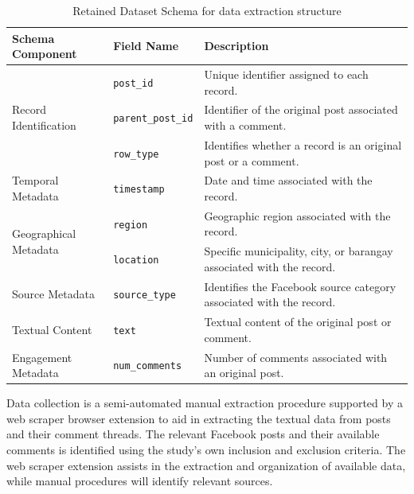 \begin{table}[htbp]
	\centering
	\caption{Retained Dataset Schema for data extraction structure}
	\label{tab:dataset_schema}
	\renewcommand{\arraystretch}{1.3}
	\begin{tabularx}{\textwidth}{l l X}
		\hline
		\textbf{Schema Component} & \textbf{Field Name} & \textbf{Description} \\
		\hline
		\multirow{3}{*}{Record Identification}
		& \texttt{post\_id} & Unique identifier assigned to each record. \\
		& \texttt{parent\_post\_id} & Identifier of the original post associated with a comment. \\
		& \texttt{row\_type} & Identifies whether a record is an original post or a comment. \\
		\hline
		Temporal Metadata
		& \texttt{timestamp} & Date and time associated with the record. \\
		\hline
		\multirow{2}{*}{Geographical Metadata}
		& \texttt{region} & Geographic region associated with the record. \\
		& \texttt{location} & Specific municipality, city, or barangay associated with the record. \\
		\hline
		Source Metadata
		& \texttt{source\_type} & Identifies the Facebook source category associated with the record. \\
		\hline
		Textual Content
		& \texttt{text} & Textual content of the original post or comment. \\
		\hline
		Engagement Metadata
		& \texttt{num\_comments} & Number of comments associated with an original post. \\
		\hline
	\end{tabularx}
\end{table}

Data collection is a semi-automated manual extraction procedure supported
by a web scraper browser extension to aid in extracting the textual data from
posts and their comment threads. The relevant Facebook posts and their
available comments is identified using the study's own inclusion and
exclusion criteria. The web scraper extension assists in the extraction and
organization of available data, while manual procedures will identify relevant
sources.

